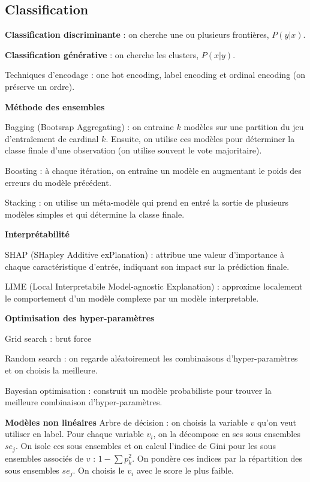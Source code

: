 \documentclass[5pt,a4paper]{article}
\begin{document}
\subsection*{Classification}

\textbf{Classification discriminante} : on cherche une ou plusieurs frontières, $P(y|x)$.

\textbf{Classification générative} : on cherche les clusters, $P(x|y)$.

Techniques d'encodage : one hot encoding, label encoding et ordinal encoding (on préserve un ordre).

\textbf{Méthode des ensembles}

Bagging (Bootsrap Aggregating) : on entraine $k$ modèles sur une partition du jeu d'entraîement de cardinal $k$. Ensuite, on utilise ces modèles pour déterminer la classe finale d'une observation (on utilise souvent le vote majoritaire).

Boosting : à chaque itération, on entraîne un modèle en augmentant le poids des erreurs du modèle précédent.

Stacking : on utilise un méta-modèle qui prend en entré la sortie de plusieurs modèles simples et qui détermine la classe finale.

\textbf{Interprétabilité}

SHAP (SHapley Additive exPlanation) : attribue une valeur d'importance à chaque caractéristique d'entrée, indiquant son impact sur la prédiction finale.

LIME (Local Interpretabile Model-agnostic Explanation) : approxime localement le comportement d'un modèle complexe par un modèle interpretable.

\textbf{Optimisation des hyper-paramètres} 

Grid search : brut force

Random search : on regarde aléatoirement les combinaisons d'hyper-paramètres et on choisis la meilleure.

Bayesian optimisation : construit un modèle probabiliste pour trouver la meilleure combinaison d'hyper-paramètres.

\textbf{Modèles non linéaires}
Arbre de décision : on choisis la variable $v$ qu'on veut utiliser en label. Pour chaque variable $v_i$, on la décompose en ses sous ensembles $se_j$. On isole ces sous ensembles et on calcul l'indice de Gini pour les sous ensembles associés de $v$ : $1-\sum p_k^2$.
On pondère ces indices par la répartition des sous ensembles $se_j$. On choisis le $v_i$ avec le score le plus faible.
\end{document}
